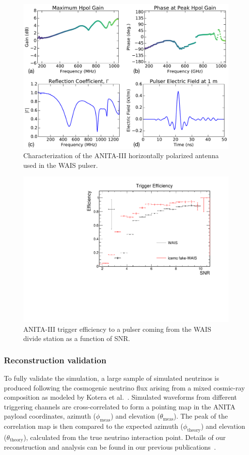 \begin{figure}
\centering
\includegraphics[width=\linewidth]{./Figs/waisPulser.pdf}
\caption{Characterization of the ANITA-III horizontally polarized antenna used in the WAIS pulser.}
\label{fig:waisPulser}
\end{figure}

\begin{figure}
\centering
\includegraphics[width=.5\linewidth]{./Figs/Efficiency_WAIS.pdf}
\caption{ANITA-III trigger efficiency to a pulser coming from the WAIS divide station as a function of SNR.}
\label{fig:waisEff}
\end{figure}

\subsubsection{Reconstruction validation}
\label{subsec:ANITA_validation_reconstruction}
To fully validate the simulation, a large sample of simulated
neutrinos is produced following the cosmogenic neutrino flux arising from a mixed cosmic-ray composition as modeled by Kotera et al.~\cite{kotera}.
Simulated waveforms from different triggering channels are
cross-correlated to form a pointing map in the ANITA payload
coordinates, azimuth ($\phi_{\mathrm{meas}}$) and elevation
($\theta_{\mathrm{meas}}$). 
The peak of the correlation map is then compared to the expected
azimuth ($\phi_{\mathrm{theory}}$) and elevation
($\theta_{\mathrm{theory}}$), calculated from the true neutrino interaction point.
Details of our reconstruction and analysis can be found in our
previous publications~\cite{ANITA1paper,ANITA2paper,romero2015interferometric}.

